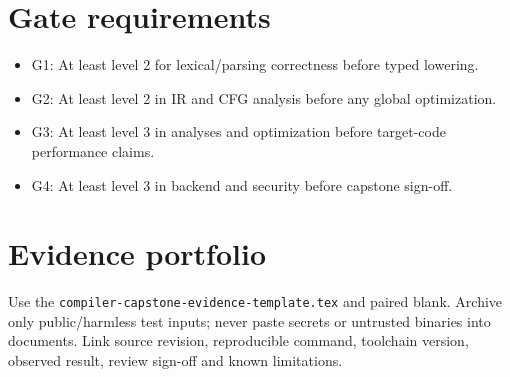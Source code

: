\documentclass[10pt,letterpaper]{article}
\begin{document}
\section{Gate requirements}
\begin{itemize}
\item G1: At least level 2 for lexical/parsing correctness before typed lowering.
\item G2: At least level 2 in IR and CFG analysis before any global optimization.
\item G3: At least level 3 in analyses and optimization before target-code performance claims.
\item G4: At least level 3 in backend and security before capstone sign-off.
\end{itemize}

\section{Evidence portfolio}
Use the \texttt{compiler-capstone-evidence-template.tex} and paired blank. Archive only public/harmless test inputs; never paste secrets or untrusted binaries into documents. Link source revision, reproducible command, toolchain version, observed result, review sign-off and known limitations.
\end{document}
